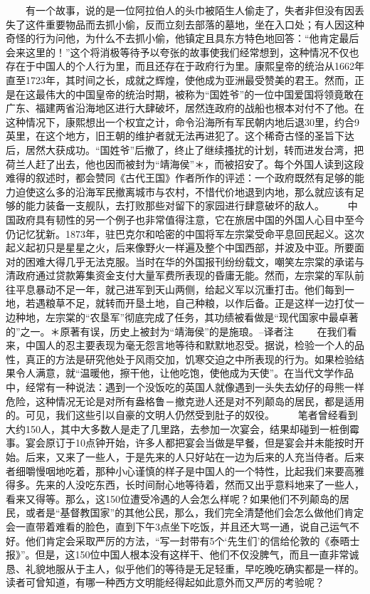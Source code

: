 \documentclass[12pt,oneside]{book}
\begin{document}
\begin{common-format}
　　有一个故事，说的是一位阿拉伯人的头巾被陌生人偷走了，失者非但没有因丢失了这件重要物品而去抓小偷，反而立刻去部落的墓地，坐在入口处；有人因这种奇怪的行为问他，为什么不去抓小偷，他镇定且具东方特色地回答：“他肯定最后会来这里的！”这个将消极等待予以夸张的故事使我们经常想到，这种情况不仅也存在于中国人的个人行为里，而且还存在于政府行为里。康熙皇帝的统治从1662年直至1723年，其时间之长，成就之辉煌，使他成为亚洲最受赞美的君王。然而，正是在这最伟大的中国皇帝的统治时期，被称为“国姓爷”的一位中国爱国将领竟敢在广东、福建两省沿海地区进行大肆破坏，居然连政府的战船也根本对付不了他。在这种情况下，康熙想出一个权宜之计，命令沿海所有军民朝内地后退30里，约合9英里，在这个地方，旧王朝的维护者就无法再进犯了。这个稀奇古怪的圣旨下达后，居然大获成功。“国姓爷”后撤了，终止了继续搔扰的计划，转而进发台湾，把荷兰人赶了出去，他也因而被封为“靖海侯”＊，而被招安了。每个外国人读到这段难得的叙述时，都会赞同《古代王国》作者所作的评述：一个政府既然有足够的能力迫使这么多的沿海军民撤离城市与农村，不惜代价地退到内地，那么就应该有足够的能力装备一支舰队，去打败那些对留下的家园进行肆意破坏的敌人。 
　　中国政府具有韧性的另一个例子也非常值得注意，它在旅居中国的外国人心目中至今仍记忆犹新。1873年，驻巴克尔和哈密的中国将军左宗棠受命平息回民起义。这次起义起初只是星星之火，后来像野火一样遍及整个中国西部，并波及中亚。所要面对的困难大得几乎无法克服。当时在华的外国报刊纷纷载文，嘲笑左宗棠的承诺与清政府通过贷款筹集资金支付大量军费所表现的昏庸无能。然而，左宗棠的军队前往平息暴动不足一年，就己进军到天山两侧，给起义军以沉重打击。他们每到一地，若遇粮草不足，就转而开垦土地，自己种粮，以作后备。正是这样一边打仗一边种地，左宗棠的“农垦军”彻底完成了任务，其功绩被看做是“现代国家中最卓著的”之一。＊原著有误，历史上被封为“靖海侯”的是施琅。--译者注 
　　在我们看来，中国人的忍主要表现为毫无怨言地等待和默默地忍受。据说，检验一个人的品性，真正的方法是研究他处于风雨交加，饥寒交迫之中所表现的行为。如果检验结果令人满意，就“温暖他，擦干他，让他吃饱，使他成为天使”。在当代文学作品中，经常有一种说法：遇到一个没饭吃的英国人就像遇到一头失去幼仔的母熊一样危险，这种情况无论是对所有盎格鲁－撤克逊人还是对不列颠岛的居民，都是适用的。可见，我们这些引以自豪的文明人仍然受到肚子的奴役。 
　　笔者曾经看到大约150人，其中大多数人是走了几里路，去参加一次宴会，结果却碰到一桩倒霉事。宴会原订于10点钟开始，许多人都把宴会当做是早餐，但是宴会并未能按时开始。后来，又来了一些人，于是先来的人只好站在一边为后来的人充当侍者。后来者细嚼慢咽地吃着，那种小心谨慎的样子是中国人的一个特性，比起我们来要高雅得多。先来的人没吃东西，长时间耐心地等待着，然而又出乎意料地来了一些人，看来又得等。那么，这150位遭受冷遇的人会怎么样呢？如果他们不列颠岛的居民，或者是“基督教国家”的其他公民，那么，我们完全清楚他们会怎么做他们肯定会一直带着难看的脸色，直到下午3点坐下吃饭，并且还大骂一通，说自己运气不好。他们肯定会采取严厉的方法，“写一封带有5个‘先生们’的信给伦敦的《泰晤士报》”。但是，这150位中国人根本没有这样干、他们不仅没脾气，而且一直非常诚恳、礼貌地服从于主人，似乎他们的等待是无足轻重，早吃晚吃确实都是一样的。读者可曾知道，有哪一种西方文明能经得起如此意外而又严厉的考验呢？ 

\end{common-format}
\end{document}
